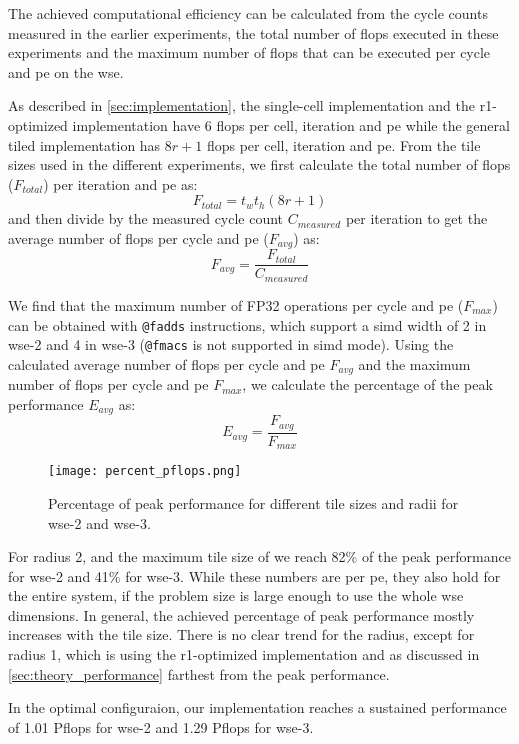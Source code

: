 The achieved computational efficiency can be calculated from the cycle counts measured in the earlier experiments, the total number of \acp{flop} executed in these experiments and the maximum number of \acp{flop} that can be executed per cycle and \ac{pe} on the \ac{wse}.

As described in \autoref{sec:implementation}, the single-cell implementation and the r1-optimized implementation have \num{6} \acp{flop} per cell, iteration and \ac{pe} while the general tiled implementation has $8r+1$ \acp{flop} per cell, iteration and \ac{pe}. From the tile sizes used in the different experiments, we first calculate the total number of \acp{flop} ($F_{total}$) per iteration and \ac{pe} as:
\begin{equation}
    F_{total} = t_w t_h (8r+1)
\end{equation}
and then divide by the measured cycle count $C_{measured}$ per iteration to get the average number of \acp{flop} per cycle and \ac{pe} ($F_{avg}$) as:
\begin{equation}
    F_{avg} = \frac{F_{total}}{C_{measured}}
\end{equation}

We find that the maximum number of FP32 operations per cycle and \ac{pe} ($F_{max}$) can be obtained with \texttt{@fadds} instructions, which support a \ac{simd} width of 2 in \ac{wse}-2 and 4 in \ac{wse}-3 (\texttt{@fmacs} is not supported in \ac{simd} mode). Using the calculated average number of \acp{flop} per cycle and \ac{pe} $F_{avg}$ and the maximum number of \acp{flop} per cycle and \ac{pe} $F_{max}$, we calculate the percentage of the peak performance $E_{avg}$ as:
\begin{equation}
    E_{avg} = \frac{F_{avg}}{F_{max}}
\end{equation}

\begin{figure}[h]
    \centering
    \texttt{[image: percent\_pflops.png]}
    \caption{Percentage of peak performance for different tile sizes and radii for \ac{wse}-2 and \ac{wse}-3.}
    \label{fig:percent_pflops}
\end{figure}

For radius 2, and the maximum tile size of  we reach \num{82}\% of the peak performance for \ac{wse}-2 and \num{41}\% for \ac{wse}-3.
While these numbers are per \ac{pe}, they also hold for the entire system, if the problem size is large enough to use the whole \ac{wse} dimensions.
In general, the achieved percentage of peak performance mostly increases with the tile size. There is no clear trend for the radius, except for radius 1, which is using the r1-optimized implementation and as discussed in \autoref{sec:theory_performance} farthest from the peak performance.

In the optimal configuraion, our implementation reaches a sustained performance of 1.01 P\ac{flops} for \ac{wse}-2 and 1.29 P\ac{flops} for \ac{wse}-3.